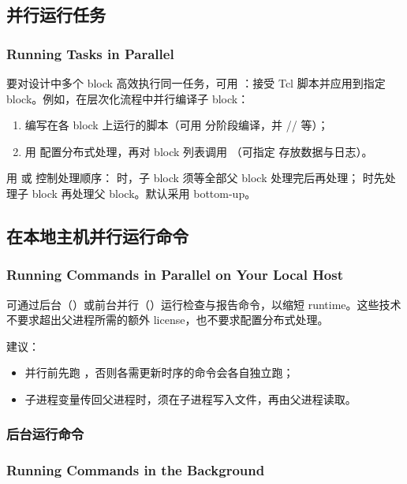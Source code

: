 \subsection{并行运行任务}
\subsubsection*{Running Tasks in Parallel}

要对设计中多个 block 高效执行同一任务，可用 ：接受 Tcl 脚本并应用到指定 block。例如，在层次化流程中并行编译子 block：
\begin{enumerate}
  \item 编写在各 block 上运行的脚本（可用  分阶段编译，并 // 等）；
  \item 用  配置分布式处理，再对 block 列表调用 （可指定  存放数据与日志）。
\end{enumerate}

用  或  控制处理顺序： 时，子 block 须等全部父 block 处理完后再处理； 时先处理子 block 再处理父 block。默认采用 bottom-up。

\subsection{在本地主机并行运行命令}
\subsubsection*{Running Commands in Parallel on Your Local Host}

可通过后台（）或前台并行（）运行检查与报告命令，以缩短 runtime。这些技术不要求超出父进程所需的额外 license，也不要求配置分布式处理。

建议：
\begin{itemize}
  \item 并行前先跑 ，否则各需更新时序的命令会各自独立跑；
  \item 子进程变量传回父进程时，须在子进程写入文件，再由父进程读取。
\end{itemize}

\subsubsection{后台运行命令}
\subsubsection*{Running Commands in the Background}


